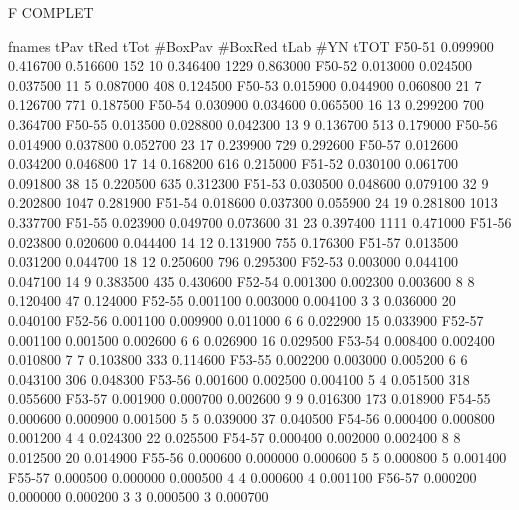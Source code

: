 F COMPLET

      fnames         tPav         tRed         tTot    #BoxPav    #BoxRed         tLab        #YN         tTOT
      F50-51     0.099900     0.416700     0.516600        152         10     0.346400       1229     0.863000
      F50-52     0.013000     0.024500     0.037500         11          5     0.087000        408     0.124500
      F50-53     0.015900     0.044900     0.060800         21          7     0.126700        771     0.187500
      F50-54     0.030900     0.034600     0.065500         16         13     0.299200        700     0.364700
      F50-55     0.013500     0.028800     0.042300         13          9     0.136700        513     0.179000
      F50-56     0.014900     0.037800     0.052700         23         17     0.239900        729     0.292600
      F50-57     0.012600     0.034200     0.046800         17         14     0.168200        616     0.215000
      F51-52     0.030100     0.061700     0.091800         38         15     0.220500        635     0.312300
      F51-53     0.030500     0.048600     0.079100         32          9     0.202800       1047     0.281900
      F51-54     0.018600     0.037300     0.055900         24         19     0.281800       1013     0.337700
      F51-55     0.023900     0.049700     0.073600         31         23     0.397400       1111     0.471000
      F51-56     0.023800     0.020600     0.044400         14         12     0.131900        755     0.176300
      F51-57     0.013500     0.031200     0.044700         18         12     0.250600        796     0.295300
      F52-53     0.003000     0.044100     0.047100         14          9     0.383500        435     0.430600
      F52-54     0.001300     0.002300     0.003600          8          8     0.120400         47     0.124000
      F52-55     0.001100     0.003000     0.004100          3          3     0.036000         20     0.040100
      F52-56     0.001100     0.009900     0.011000          6          6     0.022900         15     0.033900
      F52-57     0.001100     0.001500     0.002600          6          6     0.026900         16     0.029500
      F53-54     0.008400     0.002400     0.010800          7          7     0.103800        333     0.114600
      F53-55     0.002200     0.003000     0.005200          6          6     0.043100        306     0.048300
      F53-56     0.001600     0.002500     0.004100          5          4     0.051500        318     0.055600
      F53-57     0.001900     0.000700     0.002600          9          9     0.016300        173     0.018900
      F54-55     0.000600     0.000900     0.001500          5          5     0.039000         37     0.040500
      F54-56     0.000400     0.000800     0.001200          4          4     0.024300         22     0.025500
      F54-57     0.000400     0.002000     0.002400          8          8     0.012500         20     0.014900
      F55-56     0.000600     0.000000     0.000600          5          5     0.000800          5     0.001400
      F55-57     0.000500     0.000000     0.000500          4          4     0.000600          4     0.001100
      F56-57     0.000200     0.000000     0.000200          3          3     0.000500          3     0.000700


